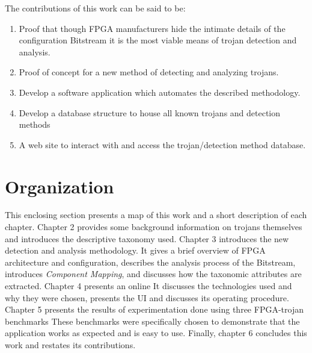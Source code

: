 The contributions of this work can be said to be:
\begin{enumerate}
	\item Proof that though \acrshort{FPGA} manufacturers hide the intimate details of the configuration \gls{Bitstream} it is the most viable means of trojan detection and analysis. 
	\item Proof of concept for a new method of detecting and analyzing trojans.
	\item Develop a software application which automates the described methodology.
	\item Develop a database structure to house all known trojans and detection methods
	\item A web site to interact with and access the trojan/detection method database.
\end{enumerate}
\section{Organization}
This enclosing section presents a map of this work and a short description of each chapter.
Chapter 2 provides some background information on trojans themselves and introduces the descriptive taxonomy used.
Chapter 3 introduces the new detection and analysis methodology.
It gives a brief overview of \acrshort{FPGA} architecture and configuration, describes the analysis process of the \gls{Bitstream}, introduces \textit{Component Mapping}, and discusses how the taxonomic attributes are extracted.
Chapter 4 presents an online 
It discusses the technologies used and why they were chosen, presents the \acrlong{UI} and discusses its operating procedure.
Chapter 5 presents the results of experimentation done using three \acrshort{FPGA}-trojan benchmarks
These benchmarks were specifically chosen to demonstrate that the application works as expected and is easy to use.
Finally, chapter 6 concludes this work and restates its contributions.